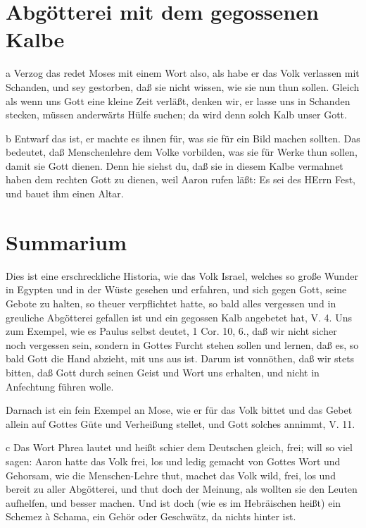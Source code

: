 \section{Abgötterei mit dem gegossenen Kalbe}

a Verzog das redet Moses mit einem Wort also, als habe er das Volk verlassen mit Schanden, und sey gestorben, daß sie nicht wissen, wie sie nun thun sollen. Gleich als wenn uns Gott eine kleine Zeit verläßt, denken wir, er lasse uns in Schanden stecken, müssen anderwärts Hülfe suchen; da wird denn solch Kalb unser Gott.

b Entwarf das ist, er machte es ihnen für, was sie für ein Bild machen sollten. Das bedeutet, daß Menschenlehre dem Volke vorbilden, was sie für Werke thun sollen, damit sie Gott dienen. Denn hie siehst du, daß sie in diesem Kalbe vermahnet haben dem rechten Gott zu dienen, weil Aaron rufen läßt: Es sei des HErrn Fest, und bauet ihm einen Altar.

\section{Summarium}

Dies ist eine erschreckliche Historia, wie das Volk Israel, welches so große Wunder in Egypten und in der Wüste gesehen und erfahren, und sich gegen Gott, seine Gebote zu halten, so theuer verpflichtet hatte, so bald alles vergessen und in greuliche Abgötterei gefallen ist und ein gegossen Kalb angebetet hat, V. 4.
Uns zum Exempel, wie es Paulus selbst deutet, 1 Cor. 10, 6., daß wir nicht sicher noch vergessen sein, sondern in Gottes Furcht stehen sollen und lernen, daß es, so bald Gott die Hand abzieht, mit uns aus ist. Darum ist vonnöthen, daß wir stets bitten, daß Gott durch seinen Geist und Wort uns erhalten, und nicht in Anfechtung führen wolle.

Darnach ist ein fein Exempel an Mose, wie er für das Volk bittet und das Gebet allein auf Gottes Güte und Verheißung stellet, und Gott solches annimmt, V. 11.

c Das Wort Phrea lautet und heißt schier dem Deutschen gleich, frei; will so viel sagen: Aaron hatte das Volk frei, los und ledig gemacht von Gottes Wort und Gehorsam, wie die Menschen-Lehre thut, machet das Volk wild, frei, los und bereit zu aller Abgötterei, und thut doch der Meinung, als wollten sie den Leuten aufhelfen, und besser machen. Und ist doch (wie es im Hebräischen heißt) ein Schemez à Schama, ein Gehör oder Geschwätz, da nichts hinter ist.


